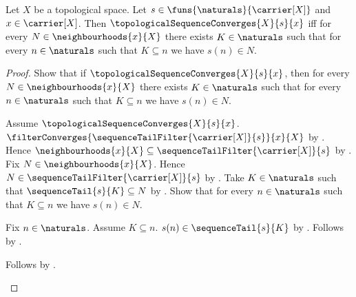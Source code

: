 \begin{theorem}\label{topological_sequence_converges_iff_eventually_in_neighbourhoods}
    Let $X$ be a topological space.
    Let $s\in\funs{\naturals}{\carrier[X]}$ and $x\in\carrier[X]$.
    Then $\topologicalSequenceConverges{X}{s}{x}$ iff
        for every $N\in\neighbourhoods{x}{X}$ there exists
            $K\in\naturals$ such that for every $n\in\naturals$
            such that $K\subseteq n$ we have $s(n)\in N$.
\end{theorem}
\begin{proof}
    Show that if $\topologicalSequenceConverges{X}{s}{x}$, then
        for every $N\in\neighbourhoods{x}{X}$ there exists
            $K\in\naturals$ such that for every $n\in\naturals$
            such that $K\subseteq n$ we have $s(n)\in N$.
    \begin{subproof}
        Assume $\topologicalSequenceConverges{X}{s}{x}$.
        $\filterConverges{\sequenceTailFilter{\carrier[X]}{s}}{x}{X}$
            by .
        Hence $\neighbourhoods{x}{X}
            \subseteq\sequenceTailFilter{\carrier[X]}{s}$
            by .
        Fix $N\in\neighbourhoods{x}{X}$.
        Hence $N\in\sequenceTailFilter{\carrier[X]}{s}$ by .
        Take $K\in\naturals$ such that $\sequenceTail{s}{K}\subseteq N$
            by .
        Show that for every $n\in\naturals$ such that $K\subseteq n$
            we have $s(n)\in N$.
        \begin{subproof}
            Fix $n\in\naturals$.
            Assume $K\subseteq n$.
            $s(n)\in\sequenceTail{s}{K}$
                by .
            Follows by .
        \end{subproof}
        Follows by \auto.
    \end{subproof}


\end{proof}
